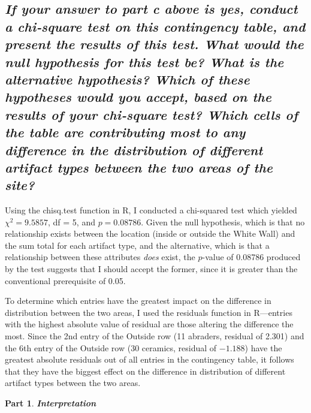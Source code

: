 \documentclass[answers]{exam}
\newtheorem{problem}{Part}
\begin{document}
\begin{parts}
\part{\textit{If your answer to part c above is \textbf{yes}, conduct a chi‐square test on this contingency table, and present the results of this test. What would the null hypothesis for this test be? What is the alternative hypothesis? Which of these hypotheses would you accept, based on the results of your chi‐square test? Which cells of the table are contributing most to any difference in the distribution of different artifact types between the two areas of the site?}}\color{nr}

\quad\quad Using the chisq.test function in R, I conducted a chi-squared test which yielded $\chi^2 = 9.5857$, df = 5, and $p = 0.08786$. Given the null hypothesis, which is that no relationship exists between the location (inside or outside the White Wall) and the sum total for each artifact type, and the alternative, which is that a relationship between these attributes \textit{does} exist, the $p$-value of 0.08786 produced by the test suggests that I should accept the former, since it is greater than the conventional prerequisite of 0.05.

\quad\quad To determine which entries have the greatest impact on the difference in distribution between the two areas, I used the residuals function in R---entries with the highest absolute value of residual are those altering the difference the most. Since the 2nd entry of the Outside row (11 abraders, residual of 2.301) and the 6th entry of the Outside row (30 ceramics, residual of $-1.188$) have the greatest absolute residuals out of all entries in the contingency table, it follows that they have the biggest effect on the difference in distribution of different artifact types between the two areas.\color{black}
\end{parts}
\begin{problem}
\textbf{Interpretation}
\end{problem}
\end{document}
